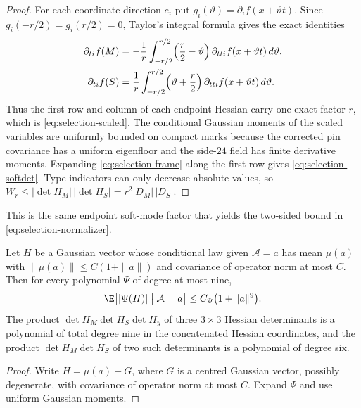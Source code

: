 \begin{proof}
For each coordinate direction $e_i$ put $g_i(\vartheta)=\partial_if(x+\vartheta t)$. Since $g_i(-r/2)=g_i(r/2)=0$, Taylor's integral formula gives the exact identities
\begin{equation}\label{eq:selection-taylor}
\begin{aligned}
\partial_{ti}f(M)&=-\frac1r\int_{-r/2}^{r/2}\Bigl(\frac r2-\vartheta\Bigr)\,\partial_{tti}f(x+\vartheta t)\,d\vartheta,\\
\partial_{ti}f(S)&=\frac1r\int_{-r/2}^{r/2}\Bigl(\vartheta+\frac r2\Bigr)\,\partial_{tti}f(x+\vartheta t)\,d\vartheta .
\end{aligned}
\end{equation}
Thus the first row and column of each endpoint Hessian carry one exact factor $r$, which is \eqref{eq:selection-scaled}. The conditional Gaussian moments of the scaled variables are uniformly bounded on compact marks because the corrected pin covariance has a uniform eigenfloor and the side-$24$ field has finite derivative moments. Expanding \eqref{eq:selection-frame} along the first row gives \eqref{eq:selection-softdet}. Type indicators can only decrease absolute values, so $W_r\le|\det H_M|\,|\det H_S|=r^2|D_M|\,|D_S|$.
\end{proof}

This is the same endpoint soft-mode factor that yields the two-sided bound in \eqref{eq:selection-normalizer}.

\begin{lemma}\label{lem:selection-moments}
Let $H$ be a Gaussian vector whose conditional law given $\mathcal A=a$ has mean $\mu(a)$ with $\|\mu(a)\|\le C(1+\|a\|)$ and covariance of operator norm at most $C$. Then for every polynomial $\Psi$ of degree at most nine,
\begin{equation}\label{eq:selection-moment9}
\E\bigl[|\Psi(H)|\bigm|\mathcal A=a\bigr]\le C_\Psi\bigl(1+\|a\|^9\bigr).
\end{equation}
The product $\det H_M\det H_S\det H_y$ of three $3\times3$ Hessian determinants is a polynomial of total degree nine in the concatenated Hessian coordinates, and the product $\det H_M\det H_S$ of two such determinants is a polynomial of degree six.
\end{lemma}

\begin{proof}
Write $H=\mu(a)+G$, where $G$ is a centred Gaussian vector, possibly degenerate, with covariance of operator norm at most $C$. Expand $\Psi$ and use uniform Gaussian moments.
\end{proof}

